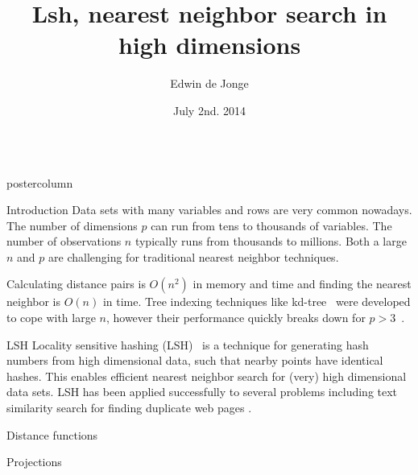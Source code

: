 \documentclass[final,hyperref={pdfpagelabels=false}]{beamer}
\title{\huge Lsh, nearest neighbor search in high dimensions}
\author{Edwin de Jonge}
\institute[Statistics Netherlands]{Methodology Department, Statistics Netherlands, Den Haag, Netherlands}
\date[July. 2nd, 2014]{July 2nd. 2014}
\newlength{\columnheight}
\begin{document}
\begin{frame}
  \begin{columns}
    \begin{column}{.49\textwidth}
      \begin{beamercolorbox}[center,wd=\textwidth]{postercolumn}
        \begin{minipage}[T]{.95\textwidth}  %
          \parbox[t][\columnheight]{\textwidth}{ %
            \begin{block}{Introduction}
            Data sets with many variables and rows are very common nowadays. The number of dimensions $p$ can run from tens to thousands of variables. The number of observations $n$ typically runs from thousands to millions.
Both a large $n$ and $p$ are challenging for traditional nearest neighbor techniques.

Calculating distance pairs is $O(n^2)$ in memory and time and finding the nearest neighbor is $O(n)$ in time.
Tree indexing techniques like kd-tree~\citep{bentley1975} were developed to cope with large $n$, however their performance quickly breaks down for $p > 3$~\citep{datar2004}. 
            \end{block}
            \vfill
            \begin{block}{LSH}
Locality sensitive hashing (LSH)~\citep{datar2004} is a technique for generating hash numbers from high dimensional data, such 
that nearby points have identical hashes. This enables efficient nearest neighbor search for (very) high dimensional data sets. LSH has been applied successfully to several problems including text similarity search for finding duplicate web pages \citep{slaney2008}.
            \end{block}
            \vfill
            \begin{block}{Distance functions}
            \end{block}
            \vfill
            \begin{block}{Projections}
            \end{block}
          }
        \end{minipage}
      \end{beamercolorbox}
    \end{column}


\end{columns}
\end{frame}
\end{document}
